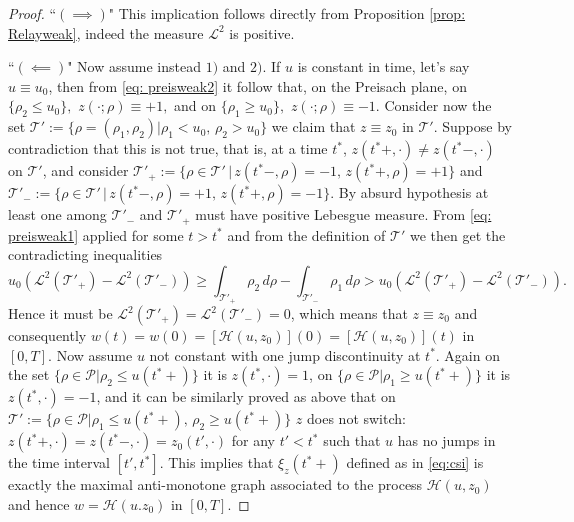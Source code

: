 \documentclass[12pt]{article}
\newcommand{\HM}{\mathcal{H}}
\newcommand{\LM}{\mathscr{L}}
\newcommand{\T}{\mathcal{T}}
\newcommand{\p}{\rho}
\newcommand{\1}{\mathds{1}}
\theoremstyle{definition}
\begin{document}
\begin{proof}    
``$(\implies)$" This implication follows directly from Proposition \ref{prop: Relayweak}, indeed the measure $\LM^2$ is positive.\par
    ``$(\impliedby )$" Now assume instead $1)$ and $2)$. If $u$ is constant in time, let's say $u\equiv u_0$, then from \eqref{eq: preisweak2} it follow that, on the Preisach plane, on $\{\p_2 \leq u_0\},$ $z(\cdot;\p)\equiv +1,$ and on $\{\p_1 \geq u_0\},$ $z(\cdot;\p)\equiv -1.$ Consider now the set $\T':=\{\rho=(\rho_1,\rho_2)|\p_1 < u_0,\, \p_2 >u_0\}$ we claim that $z\equiv z_0$ in $\T'$. 
    Suppose by contradiction that this is not true, that is, at a time $t^*$, $z(t^*+,\cdot)\not = z(t^*-,\cdot)$ on $\T'$, and consider $\T'_+:=\{\p\in \T' \,|\, z(t^*-,\rho)=-1,\, z(t^*+,\rho)=+1\} $ and $\T'_-:=\{\p \in \T'\,|\, z(t^*-,\rho)=+1,\, z(t^*+,\rho)=-1\}.$ By absurd hypothesis at least one among $\T'_-$ and $\T'_+$ must have positive Lebesgue measure. From \eqref{eq: preisweak1} applied for some $t>t^*$ and from the definition of $\T'$ we then get the contradicting inequalities \[u_0 (\LM^2(\T'_+)-\LM^2(\T'_-)) \geq \int_{\T'_+} \p_2 \, d\p - \int_{\T'_-} \p_1 \, d\p> u_0 (\LM^2(\T'_+)-\LM^2(\T'_-)).  \] Hence it must be $\LM^2(\T'_+)=\LM^2(\T'_-)=0$, which means that $z \equiv z_0$ and consequently $w(t)=w(0)=[\HM(u,z_0)](0)=[\HM(u,z_0)](t)$ in $[0,T]$. Now assume $u$ not constant with one jump discontinuity at $t^*$. Again on the set $\{\rho\in{\mathcal P}|\p_2 \leq u(t^*+)\}$ it is $z(t^*,\cdot)=1$, on $\{\p\in{\mathcal P}|\p_1 \geq  u(t^*+)\}$ it is $z(t^*,\cdot)=-1$, and it can be similarly proved as above that on $\T':=\{\p\in{\mathcal P}|\p_1 \leq  u(t^*+),\, \p_2 \geq  u(t^*+)\}$ $z$ does not switch: $z(t^*+,\cdot)=z(t^*-,\cdot)=z_0(t',\cdot)$ for any $t'<t^*$ such that $u$ has no jumps in the time interval $[t',t^*]$. This implies that $\xi_z(t^*+)$ defined as in \eqref{eq:csi} is exactly  the maximal anti-monotone graph associated to the process $\HM(u,z_0)$ and hence $w=\HM(u.z_0)$ in $[0,T]$. 
\end{proof}
\end{document}
